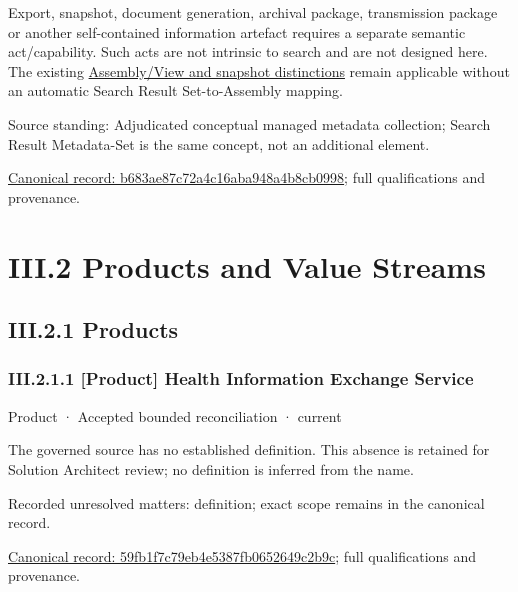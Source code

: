 Export, snapshot, document generation, archival package, transmission package
or another self-contained information artefact requires a separate semantic
act/capability. Such acts are not intrinsic to search and are not designed here.
The existing \href{\detokenize{../../../../../../../../docs/markdown/04-information-architecture/assemblies-views/assemblies-and-views.md#3-assembly-lifecycle-vs-constituent-lifecycle}}{Assembly/View and snapshot distinctions}
remain applicable without an automatic Search Result Set-to-Assembly mapping.



Source standing: Adjudicated conceptual managed metadata collection; Search Result Metadata-Set is the same concept, not an additional element.


{\footnotesize \href{../../../../../../../continuum/business/business-object/b683ae87c72a4c16aba948a4b8cb0998.md}{Canonical record: b683ae87c72a4c16aba948a4b8cb0998}; full qualifications and provenance.}\par
\chapter*{III.2 Products and Value Streams}
\label{navigation:III.2}

\section*{III.2.1 Products}
\label{navigation:III.2.1}

\subsection*{III.2.1.1 [Product] Health Information Exchange Service}
\label{navigation:III.2.1.1}

\label{element:59fb1f7c79eb4e5387fb0652649c2b9c}
{\small Product · Accepted bounded reconciliation · current}\par

The governed source has no established definition. This absence is retained for Solution Architect review; no definition is inferred from the name.


{\small Recorded unresolved matters: definition; exact scope remains in the canonical record.}\par
{\footnotesize \href{../../../../../../../continuum/business/product/59fb1f7c79eb4e5387fb0652649c2b9c.md}{Canonical record: 59fb1f7c79eb4e5387fb0652649c2b9c}; full qualifications and provenance.}\par

